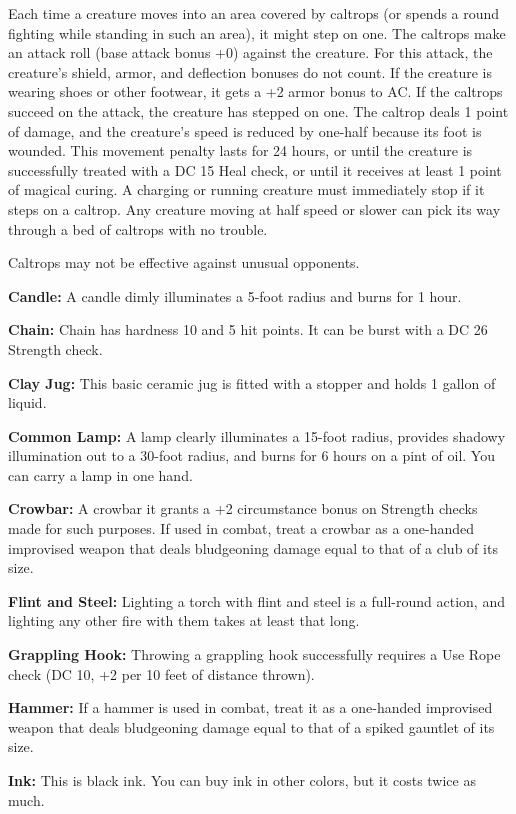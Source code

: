 Each time a creature moves into an area covered by caltrops (or spends a round 
fighting while standing in such an area), it might step on one. The caltrops make 
an attack roll (base attack bonus +0) against the creature. For this attack, the 
creature's shield, armor, and deflection bonuses do not count. If the creature 
is wearing shoes or other footwear, it gets a +2 armor bonus to AC. If the caltrops 
succeed on the attack, the creature has stepped on one. The caltrop deals 1 point 
of damage, and the creature's speed is reduced by one-half because its foot is 
wounded. This movement penalty lasts for 24 hours, or until the creature is successfully 
treated with a DC 15 Heal check, or until it receives at least 1 point of magical 
curing. A charging or running creature must immediately stop if it steps on a caltrop. 
Any creature moving at half speed or slower can pick its way through a bed of caltrops 
with no trouble.

Caltrops may not be effective against unusual opponents.

\textbf{Candle:} A candle dimly illuminates a 5-foot radius and burns for 1 hour.

\textbf{Chain:} Chain has hardness 10 and 5 hit points. It can be burst with a 
DC 26 Strength check.

\textbf{Clay Jug:} This basic ceramic jug is fitted with a stopper and holds 1 gallon of liquid.

\textbf{Common Lamp:} A lamp clearly illuminates a 15-foot radius, provides shadowy 
illumination out to a 30-foot radius, and burns for 6 hours on a pint of oil. You 
can carry a lamp in one hand. 

\textbf{Crowbar:} A crowbar it grants a +2 circumstance bonus on Strength checks 
made for such purposes. If used in combat, treat a crowbar as a one-handed improvised 
weapon that deals bludgeoning damage equal to that of a club of its size.

\textbf{Flint and Steel:} Lighting a torch with flint and steel is a full-round 
action, and lighting any other fire with them takes at least that long.

\textbf{Grappling Hook:} Throwing a grappling hook successfully requires a Use 
Rope check (DC 10, +2 per 10 feet of distance thrown).

\textbf{Hammer:} If a hammer is used in combat, treat it as a one-handed improvised 
weapon that deals bludgeoning damage equal to that of a spiked gauntlet of its 
size.

\textbf{Ink:} This is black ink. You can buy ink in other colors, but it costs 
twice as much.

